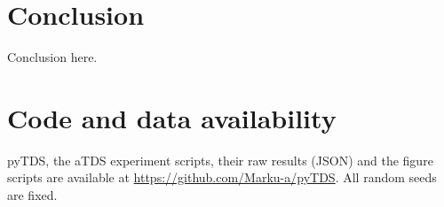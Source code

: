 \documentclass[11pt,a4paper]{article}
\begin{document}
\section{Conclusion}
\label{sec:conclusion}
Conclusion here.

\section*{Code and data availability}
pyTDS, the aTDS experiment scripts, their raw results (JSON) and the figure scripts are available at \url{https://github.com/Marku-a/pyTDS}. All random seeds are fixed.




\end{document}

